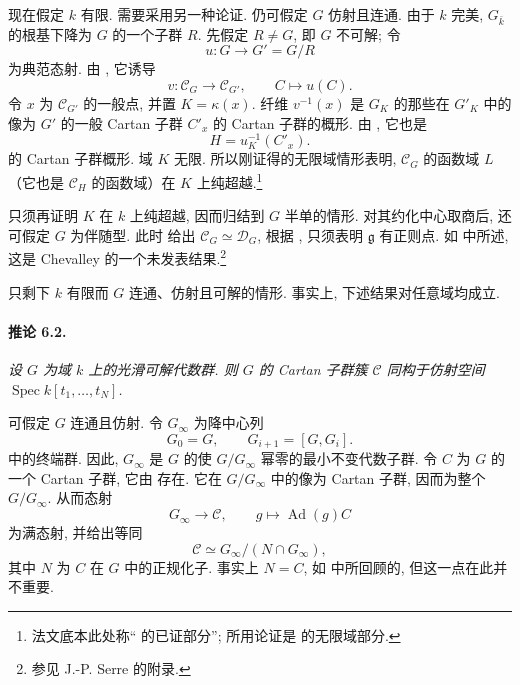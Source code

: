 现在假定 \(k\) 有限. 需要采用另一种论证. 仍可假定 \(G\) 仿射且连通. 由于 \(k\) 完美, \(G_{\bar k}\) 的根基下降为 \(G\) 的一个子群 \(R\). 先假定 \(R\ne G\), 即 \(G\) 不可解; 令
\[
  u\colon G\longrightarrow G'=G/R
\]
为典范态射. 由 \textup{}, 它诱导
\[
  v\colon\mathcal C_G\longrightarrow\mathcal C_{G'},
  \qquad C\longmapsto u(C).
\]
令 \(x\) 为 \(\mathcal C_{G'}\) 的一般点, 并置 \(K=\kappa(x)\). 纤维 \(v^{-1}(x)\) 是 \(G_K\) 的那些在 \(G'_K\) 中的像为 \(G'\) 的一般 Cartan 子群 \(C'_x\) 的 Cartan 子群的概形. 由 \textup{}, 它也是
\[
  H=u_K^{-1}(C'_x).
\]
的 Cartan 子群概形. 域 \(K\) 无限. 所以刚证得的无限域情形表明, \(\mathcal C_G\) 的函数域 \(L\)（它也是 \(\mathcal C_H\) 的函数域）在 \(K\) 上纯超越.\footnote{法文底本此处称“ 的已证部分”; 所用论证是 的无限域部分.}

只须再证明 \(K\) 在 \(k\) 上纯超越, 因而归结到 \(G\) 半单的情形. 对其约化中心取商后, 还可假定 \(G\) 为伴随型. 此时  给出 \(\mathcal C_G\simeq\mathcal D_G\), 根据 , 只须表明 \(\mathfrak g\) 有正则点. 如  中所述, 这是 Chevalley 的一个未发表结果.\footnote{参见 J.-P. Serre 的附录.}

只剩下 \(k\) 有限而 \(G\) 连通、仿射且可解的情形. 事实上, 下述结果对任意域均成立.



\paragraph{\textbf{推论 6.2.}}
{\itshape 设 \(G\) 为域 \(k\) 上的光滑可解代数群. 则 \(G\) 的 Cartan 子群簇 \(\mathcal C\) 同构于仿射空间 \(\operatorname{Spec}k[t_1,\ldots,t_N]\).}

可假定 \(G\) 连通且仿射. 令 \(G_\infty\) 为降中心列
\[
  G_0=G,\qquad G_{i+1}=[G,G_i].
\]
中的终端群. 因此, \(G_\infty\) 是 \(G\) 的使 \(G/G_\infty\) 幂零的最小不变代数子群. 令 \(C\) 为 \(G\) 的一个 Cartan 子群, 它由  存在. 它在 \(G/G_\infty\) 中的像为 Cartan 子群, 因而为整个 \(G/G_\infty\). 从而态射
\[
  G_\infty\longrightarrow\mathcal C,\qquad
  g\longmapsto\operatorname{Ad}(g)C
\]
为满态射, 并给出等同
\[
  \mathcal C\simeq G_\infty/(N\cap G_\infty),
\]
其中 \(N\) 为 \(C\) 在 \(G\) 中的正规化子. 事实上 \(N=C\), 如  中所回顾的, 但这一点在此并不重要.

